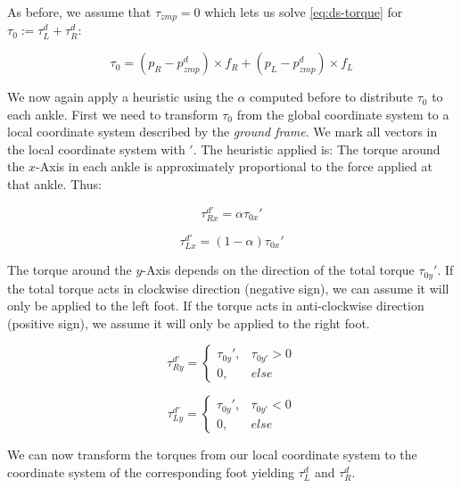 \documentclass[english,ngerman]{KITreprt}
\begin{document}
As before, we assume that $\tau_{zmp} = 0$ which lets us solve
\ref{eq:ds-torque} for $\tau_0 := \tau^d_L + \tau^d_R$:

\begin{equation} \label{eq:tau0-torque}
\tau_0 = (p_R - p^d_{zmp}) \times f_R + (p_L - p^d_{zmp}) \times f_L
\end{equation}

We now again apply a heuristic using the $\alpha$ computed before to
distribute $\tau_0$ to each ankle. First we need to transform $\tau_0$
from the global coordinate system to a local coordinate system described
by the \emph{ground frame}. We mark all vectors in the local coordinate
system with $'$. The heuristic applied is: The torque around the
$x$-Axis in each ankle is approximately proportional to the force
applied at that ankle. Thus:

\begin{equation} \label{eq:torque-right-x}
\tau^{d'}_{Rx} = \alpha \tau_{0x}'
\end{equation}

\begin{equation} \label{eq:torque-left-x}
\tau^{d'}_{Lx} = (1-\alpha) \tau_{0x}'
\end{equation}

The torque around the $y$-Axis depends on the direction of the total
torque $\tau_{0y}'$. If the total torque acts in clockwise direction
(negative sign), we can assume it will only be applied to the left foot.
If the torque acts in anti-clockwise direction (positive sign), we
assume it will only be applied to the right foot.

\begin{equation} \label{eq:torque-right-x}
\tau^{d'}_{Ry} = \left\{
\begin{array}{lr}
\tau_{0y}', & \tau_{0y'} > 0 \\
0, & else
\end{array}
\right.
\end{equation}

\begin{equation} \label{eq:torque-left-x}
\tau^{d'}_{Ly} = \left\{
\begin{array}{lr}
\tau_{0y}', & \tau_{0y'} < 0 \\
0, & else
\end{array}
\right.
\end{equation}

We can now transform the torques from our local coordinate system to the
coordinate system of the corresponding foot yielding $\tau^d_L$ and
$\tau^d_R$.
\end{document}
